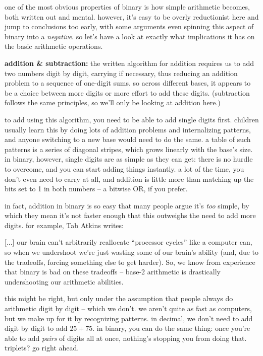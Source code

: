 \documentclass[../best.tex]{subfiles}
\begin{document}

one of the most obvious properties of binary is how simple arithmetic becomes, both written out and mental. however, it's easy to be overly reductionist here and jump to conclusions too early, with some arguments even spinning this aspect of binary into a \emph{negative}. so let's have a look at exactly what implications it has on the basic arithmetic operations.

{\bf addition \& subtraction:} the written algorithm for addition requires us to add two numbers digit by digit, carrying if necessary, thus reducing an addition problem to a sequence of one-digit sums. so across different bases, it appears to be a choice between more digits or more effort to add these digits.\myfootnote{} (subtraction follows the same principles, so we'll only be looking at addition here.)

to add using this algorithm, you need to be able to add single digits first. children usually learn this by doing lots of addition problems and internalizing patterns, and anyone switching to a new base would need to do the same. a table of such patterns is a series of diagonal stripes, which grows linearly with the base's size. in binary, however, single digits are as simple as they can get: there is no hurdle to overcome, and you can start adding things instantly.\myfootnote{} a lot of the time, you don't even need to carry at all, and addition is little more than matching up the bits set to 1 in both numbers -- a bitwise OR, if you prefer.\myfootnote{}

in fact, addition in binary is so easy that many people argue it's \emph{too} simple, by which they mean it's not faster enough that this outweighs the need to add more digits. for example, Tab Atkins writes:\myfootnote{}

\begin{quoting}
	{[...]} our brain can't arbitrarily reallocate ``processor cycles'' like a computer can, so when we undershoot we're just wasting some of our brain's ability (and, due to the tradeoffs, forcing something else to get harder). So, we know from experience that binary is bad on these tradeoffs -- base-2 arithmetic is drastically undershooting our arithmetic abilities.
\end{quoting}

this might be right, but only under the assumption that people always do arithmetic digit by digit -- which we don't. we aren't quite as fast as computers, but we make up for it by recognizing patterns. in decimal, we don't need to add digit by digit to add $25 + 75$. in binary, you can do the same thing: once you're able to add \emph{pairs} of digits all at once, nothing's stopping you from doing that. triplets? go right ahead.
\end{document}
